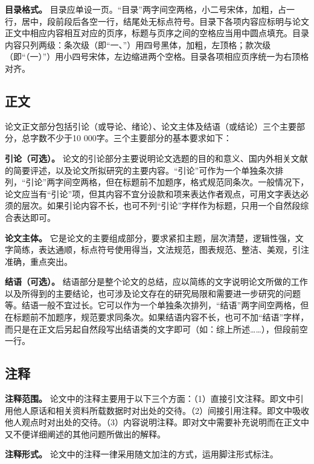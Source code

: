 \documentclass[singlesided]{Style/ucasthesis}%
\begin{document}
\textbf{目录格式。} 目录应单设一页。``目录''两字间空两格，小二号宋体，加粗，占一行，居中，段前段后各空一行，结尾处无标点符号。目录下各项内容应标明与论文正文中相应内容相互对应的页序，标题与页序之间的空格应当用中圆点填充。目录内容只列两级：条次级（即``一、''）用四号黑体，加粗，左顶格；款次级（即``（一）''）用小四号宋体，左边缩进两个空格。目录各项相应页序统一为右顶格对齐。

\hypertarget{section-18}{%
\subsection{正文}\label{section-18}}

论文正文部分包括引论（或导论、绪论）、论文主体及结语（或结论）三个主要部分，总字数不少于10 000字。三个主要部分的基本要求如下：

\textbf{引论（可选）。} 论文的引论部分主要说明论文选题的目的和意义、国内外相关文献的简要评述，以及论文所拟研究的主要内容。``引论''可作为一个单独条次排列，``引论''两字间空两格，但在标题前不加题序，格式规范同条次。一般情况下，论文应当有``引论''项，但其内容不宜分设款和项来表达作者观点，可用文字表达必须的层次。如果引论内容不长，也可不列``引论''字样作为标题，只用一个自然段综合表达即可。

\textbf{论文主体。} 它是论文的主要组成部分，要求紧扣主题，层次清楚，逻辑性强，文字简练，表达通顺，标点符号使用得当，文法规范，图表规范、整洁、美观，引注准确，重点突出。

\textbf{结语（可选）。} 结语部分是整个论文的总结，应以简练的文字说明论文所做的工作以及所得到的主要结论，也可涉及论文存在的研究局限和需要进一步研究的问题等。结语一般不宜过长。它可以作为一个单独条次排列，``结语''两字间空两格，但在标题前不加题序，规范要求同条次。如果结语内容不长，也可不加``结语''字样，而只是在正文后另起自然段写出结语类的文字即可（如：综上所述\ldots{}\ldots{}），但段前空一行。

\hypertarget{section-19}{%
\subsection{注释}\label{section-19}}

\textbf{注释范围。} 论文中的注释主要用于以下三个方面：（1）直接引文注释。即文中引用他人原话和相关资料所载数据时对出处的交待。（2）间接引用注释。即文中吸收他人观点时对出处的交待。（3）内容说明注释。即对文中需要补充说明而在正文中又不便详细阐述的其他问题所做出的解释。

\textbf{注释形式。} 论文中的注释一律采用随文加注的方式，运用脚注形式标注。
\end{document}
